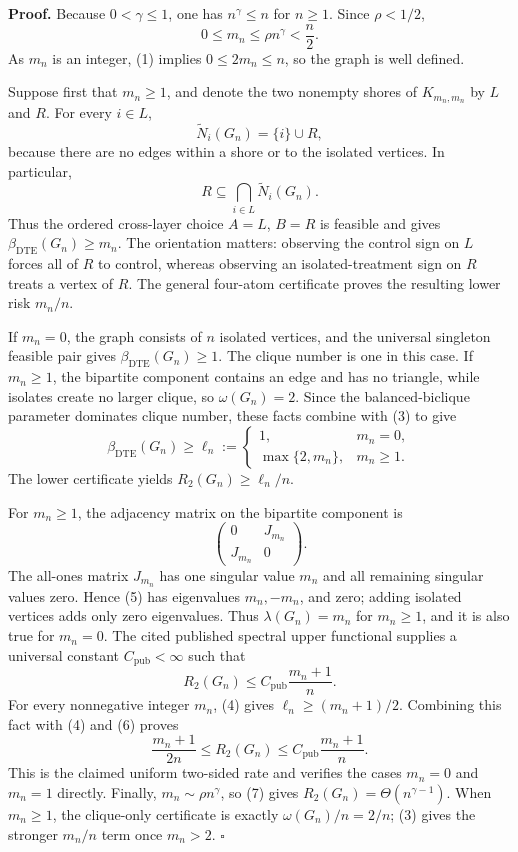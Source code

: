 \textbf{Proof.}
Because \(0<\gamma\leq1\), one has \(n^{\gamma}\leq n\) for \(n\geq1\).  Since \(\rho<1/2\),
\[
0\leq m_n\leq\rho n^{\gamma}<\frac n2.
\tag{1}
\]
As \(m_n\) is an integer, (1) implies \(0\leq2m_n\leq n\), so the graph is well defined.

Suppose first that \(m_n\geq1\), and denote the two nonempty shores of \(K_{m_n,m_n}\) by \(L\) and \(R\).  For every \(i\in L\),
\[
\widetilde N_i(G_n)=\{i\}\cup R,
\tag{2}
\]
because there are no edges within a shore or to the isolated vertices.  In particular,
\[
R\subseteq\bigcap_{i\in L}\widetilde N_i(G_n).
\tag{3}
\]
Thus the ordered cross-layer choice \(A=L\), \(B=R\) is feasible and gives \(\beta_{\mathrm{DTE}}(G_n)\geq m_n\).  The orientation matters: observing the control sign on \(L\) forces all of \(R\) to control, whereas observing an isolated-treatment sign on \(R\) treats a vertex of \(R\).  The general four-atom certificate proves the resulting lower risk \(m_n/n\).

If \(m_n=0\), the graph consists of \(n\) isolated vertices, and the universal singleton feasible pair gives \(\beta_{\mathrm{DTE}}(G_n)\geq1\).  The clique number is one in this case.  If \(m_n\geq1\), the bipartite component contains an edge and has no triangle, while isolates create no larger clique, so \(\omega(G_n)=2\).  Since the balanced-biclique parameter dominates clique number, these facts combine with (3) to give
\[
\beta_{\mathrm{DTE}}(G_n)\geq
\ell_n:=
\begin{cases}
1,&m_n=0,\\
\max\{2,m_n\},&m_n\geq1.
\end{cases}
\tag{4}
\]
The lower certificate yields \(R_2(G_n)\geq\ell_n/n\).

For \(m_n\geq1\), the adjacency matrix on the bipartite component is
\[
\begin{pmatrix}0&J_{m_n}\\J_{m_n}&0\end{pmatrix}.
\tag{5}
\]
The all-ones matrix \(J_{m_n}\) has one singular value \(m_n\) and all remaining singular values zero.  Hence (5) has eigenvalues \(m_n,-m_n\), and zero; adding isolated vertices adds only zero eigenvalues.  Thus \(\lambda(G_n)=m_n\) for \(m_n\geq1\), and it is also true for \(m_n=0\).  The cited published spectral upper functional supplies a universal constant \(C_{\mathrm{pub}}<\infty\) such that
\[
R_2(G_n)\leq C_{\mathrm{pub}}\frac{m_n+1}{n}.
\tag{6}
\]
For every nonnegative integer \(m_n\), (4) gives \(\ell_n\geq(m_n+1)/2\).  Combining this fact with (4) and (6) proves
\[
\frac{m_n+1}{2n}\leq R_2(G_n)
\leq C_{\mathrm{pub}}\frac{m_n+1}{n}.
\tag{7}
\]
This is the claimed uniform two-sided rate and verifies the cases \(m_n=0\) and \(m_n=1\) directly.  Finally, \(m_n\sim\rho n^{\gamma}\), so (7) gives \(R_2(G_n)=\Theta(n^{\gamma-1})\).  When \(m_n\geq1\), the clique-only certificate is exactly \(\omega(G_n)/n=2/n\); (3) gives the stronger \(m_n/n\) term once \(m_n>2\). \(\square\)